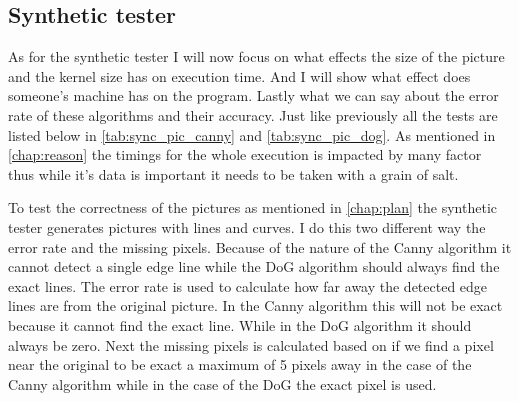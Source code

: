 \subsection{Synthetic tester}
\label{chap:test_synt_test}

As for the synthetic tester I will now focus on what effects the size of the picture and the kernel size has on execution time. And I will show what effect does someone's machine has on the program. Lastly what we can say about the error rate of these algorithms and their accuracy. Just like previously all the tests are listed below in \autoref{tab:sync_pic_canny} and \autoref{tab:sync_pic_dog}. As mentioned in \autoref{chap:reason} the timings for the whole execution is impacted by many factor thus while it's data is important it needs to be taken with a grain of salt.

To test the correctness of the pictures as mentioned in \autoref{chap:plan} the synthetic tester generates pictures with lines and curves. I do this two different way the error rate and the missing pixels. Because of the nature of the \ac{Canny} algorithm it cannot detect a single edge line while the \ac{DoG} algorithm should always find the exact lines. The error rate is used to calculate how far away the detected edge lines are from the original picture. In the \ac{Canny} algorithm this will not be exact because it cannot find the exact line. While in the \ac{DoG} algorithm it should always be zero. Next the missing pixels is calculated based on if we find a pixel near the original to be exact a maximum of 5 pixels away in the case of the \ac{Canny} algorithm while in the case of the \ac{DoG} the exact pixel is used.

\begin{table}[H]
\centering
{}
\caption{Test plans for the  Synthetic tester for \ac{Canny} algorithm}
\label{tab:sync_pic_canny}
\end{table}

\begin{table}[H]
\centering
{}
\caption{Test plans for the  Synthetic tester for \ac{DoG} algorithm}
\label{tab:sync_pic_dog}
\end{table}


